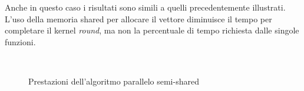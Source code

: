 Anche in questo caso i risultati sono simili a quelli precedentemente illustrati. L'uso della memoria shared per allocare il vettore diminuisce il tempo per completare il kernel \textit{round}, ma non la percentuale di tempo richiesta dalle singole funzioni.

\begin{figure}[H]
	\centering
	 \\
	\caption{Prestazioni dell'algoritmo parallelo semi-shared}
\end{figure}
